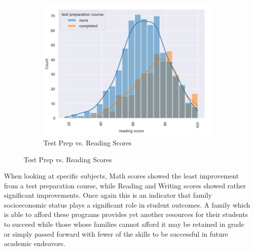 \documentclass[doc]{apa6} %
\begin{document}
\begin{figure}[H]
    \begin{subfigure}[b]{0.25\textwidth}
        \includegraphics[width=\linewidth]{TestPrepReading.png}
        \caption{Test Prep vs. Reading Scores}
        \label{fig:TestPrepRead}
    \end{subfigure}
\end{figure}
When looking at specific subjects, Math scores showed the least improvement from a test preparation course, while Reading and Writing scores showed rather significant improvements.  Once again this is an indicator that family socioeconomic status plays a significant role in student outcomes. A family which is able to afford these programs provides yet another resources for their students to succeed while those whose families cannot afford it may be retained in grade or simply passed forward with fewer of the skills to be successful in future academic endeavors.
\end{document}
